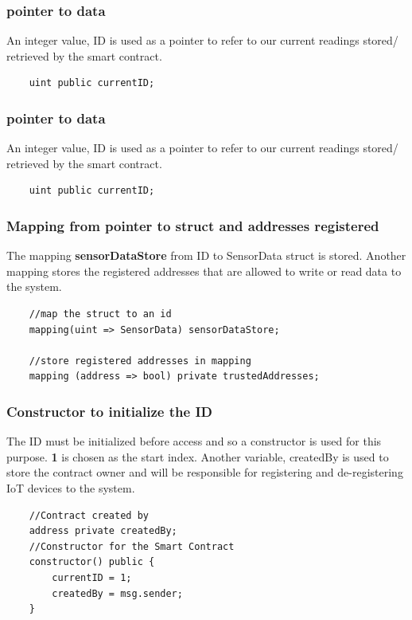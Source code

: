 \documentclass[11pt,openright]{report}
\begin{document}
\subsubsection{pointer to data}
An integer value, ID is used as a pointer to refer to our current readings stored/ retrieved by the smart contract.
\begin{verbatim}
    uint public currentID;
\end{verbatim}

\subsubsection{pointer to data}
An integer value, ID is used as a pointer to refer to our current readings stored/ retrieved by the smart contract.
\begin{verbatim}
    uint public currentID;
\end{verbatim}

\subsubsection{Mapping from pointer to struct and addresses registered}
The mapping \textbf{sensorDataStore} from ID to SensorData struct is stored. Another mapping stores the registered addresses that are allowed to write or read data to the system.
\begin{verbatim}
    //map the struct to an id
    mapping(uint => SensorData) sensorDataStore;

    //store registered addresses in mapping
    mapping (address => bool) private trustedAddresses;
\end{verbatim}

\subsubsection{Constructor to initialize the ID}
The ID must be initialized before access and so a constructor is used for this purpose. \textbf{1}  is chosen as the start index. Another variable, createdBy is used to store the contract owner and will be responsible for registering and de-registering IoT devices to the system.
\begin{verbatim}
    //Contract created by
    address private createdBy;
    //Constructor for the Smart Contract
    constructor() public {
        currentID = 1;
        createdBy = msg.sender;
    }
\end{verbatim}
\end{document}
